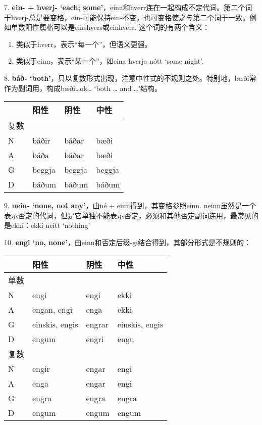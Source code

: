 7. \textbf{ein- + hverj- `each;
  some‌'}，einn和hverr连在一起构成不定代词。第二个词干hverj-总是要变格，ein-可能保持ein-不变，也可变格使之与第二个词干一致。例如单数阳性属格可以是einshvers或einhvers.
这个词的有两个含义：

\begin{enumerate}
  \def\labelenumi{\Alph{enumi}.}
  \item
        类似于hverr，表示``每一个''，但语义更强。
  \item
        类似于einn，表示``某一个''，如eina hverja nótt `some night'.
\end{enumerate}

8. \textbf{báð-
  `both‌'}，只以复数形式出现，注意中性式的不规则之处。特别地，bæði常作为副词用，构成bæði\ldots ok\ldots{}
`both \ldots{} and \ldots'结构。

\begin{longtable}{llll}
  \toprule
       & 阳性   & 阴性   & 中性   \\
  \midrule
  \endhead
  \bottomrule
  \endfoot
  复数 &        &        &        \\
  N    & báðir  & báðar  & bæði   \\
  A    & báða   & báðar  & bæði   \\
  G    & beggja & beggja & beggja \\
  D    & báðum  & báðum  & báðum  \\
\end{longtable}

9. \textbf{nein- `none, not any‌'}，由né + einn得到，其变格参照einn.
neinn虽然是一个表示否定的代词，但是它单独不能表示否定，必须和其他否定副词连用，最常见的是ekki：ekki
neitt `nothing'

10. \textbf{engi `no,
  none‌'}，由einn和否定后缀-gi结合得到，其部分形式是不规则的：

\begin{longtable}{llll}
  \toprule
       & 阳性           & 阴性   & 中性           \\
  \midrule
  \endhead
  \bottomrule
  \endfoot
  单数 &                &        &                \\
  N    & engi           & engi   & ekki           \\
  A    & engan, engi    & enga   & ekki           \\
  G    & einskis, engis & engrar & einskis, engis \\
  D    & engum          & engri  & engu           \\
  复数 &                &        &                \\
  N    & engir          & engar  & engi           \\
  A    & enga           & engar  & engi           \\
  G    & engra          & engra  & engra          \\
  D    & engum          & engum  & engum          \\
\end{longtable}

